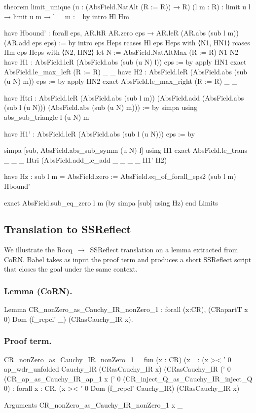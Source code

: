 \documentclass{article}
\theoremstyle{plain}
\theoremstyle{definition}
\theoremstyle{remark}
\begin{document}
\begin{rocq}
		theorem limit_unique (u : (AbsField.NatAlt (R := R)) → R) (l m : R) :
		limit u l → limit u m → l = m :=
		by
		intro Hl Hm
		
		have Hbound' : forall eps, AR.ltR AR.zero eps → AR.leR (AR.abs (sub l m)) 
		(AR.add eps eps) := by
		intro eps Heps
		rcases Hl eps Heps with ⟨N1, HN1⟩
		rcases Hm eps Heps with ⟨N2, HN2⟩
		let N := AbsField.NatAltMax (R := R) N1 N2
		have H1 : AbsField.leR (AbsField.abs (sub (u N) l)) eps := by
		apply HN1
		exact AbsField.le_max_left (R := R) _ _
		have H2 : AbsField.leR (AbsField.abs (sub (u N) m)) eps := by
		apply HN2
		exact AbsField.le_max_right (R := R) _ _
		
		have Htri : AbsField.leR (AbsField.abs (sub l m)) (AbsField.add 
		(AbsField.abs (sub l (u N))) (AbsField.abs (sub (u N) m))) := by
		simpa using abs_sub_triangle l (u N) m
		
		
		have H1' : AbsField.leR (AbsField.abs (sub l (u N))) eps := by
		
		simpa [sub, AbsField.abs_sub_symm (u N) l] using H1
		exact AbsField.le_trans _ _ _ Htri (AbsField.add_le_add _ _ _ _ H1' H2)
		
		have Hz : sub l m = AbsField.zero := AbsField.eq_of_forall_eps2 (sub l m) Hbound'
		
		exact AbsField.sub_eq_zero l m (by simpa [sub] using Hz)
		end Limits
	\end{rocq}
	
	
	\subsection{Translation to SSReflect}
	\label{app:ssreflect}
	
	We illustrate the Rocq~$\to$~SSReflect translation on a lemma extracted from CoRN. Babel takes as input the proof term and produces a short SSReflect script that closes the goal under the same context.
	
	\subsubsection*{Lemma (CoRN).}
	\begin{rocq}
		Lemma CR_nonZero_as_Cauchy_IR_nonZero_1 :
		forall (x:CR), (CRapartT x 0)%
		Dom (f_rcpcl' _) (CRasCauchy_IR x).
	\end{rocq}
	
	\subsubsection*{Proof term.}
	\begin{rocq}
		CR_nonZero_as_Cauchy_IR_nonZero_1 =
		fun (x : CR) (x_ : (x >< ' 0%
		ap_wdr_unfolded Cauchy_IR (CRasCauchy_IR x) (CRasCauchy_IR (' 0%
		(CR_ap_as_Cauchy_IR_ap_1 x (' 0%
		(CR_inject_Q_as_Cauchy_IR_inject_Q 0)
		: forall x : CR,
		(x >< ' 0%
		Dom (f_rcpcl' Cauchy_IR) (CRasCauchy_IR x)
		
		Arguments CR_nonZero_as_Cauchy_IR_nonZero_1 x _
	\end{rocq}
	
\end{document}
